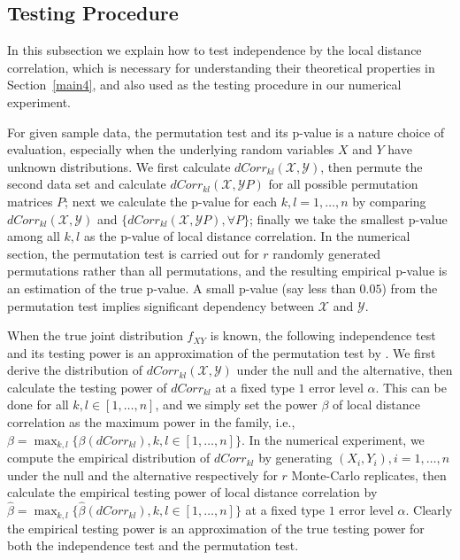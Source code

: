 \documentclass[12pt]{article}
\begin{document}
\subsection{Testing Procedure}
\label{main3}
In this subsection we explain how to test independence by the local distance correlation, which is necessary for understanding their theoretical properties in Section~\ref{main4}, and also used as the testing procedure in our numerical experiment.

For given sample data, the permutation test and its p-value is a nature choice of evaluation, especially when the underlying random variables $X$ and $Y$ have unknown distributions. We first calculate $dCorr_{kl}(\mathcal{X},\mathcal{Y})$, then permute the second data set and calculate $dCorr_{kl}(\mathcal{X},\mathcal{Y}P)$ for all possible permutation matrices $P$; next we calculate the p-value for each $k,l=1,\ldots,n$ by comparing $dCorr_{kl}(\mathcal{X},\mathcal{Y})$ and $\{dCorr_{kl}(\mathcal{X},\mathcal{Y}P), \forall P\}$; finally we take the smallest p-value among all $k,l$ as the p-value of local distance correlation. In the numerical section, the permutation test is carried out for $r$ randomly generated permutations rather than all permutations, and the resulting empirical p-value is an estimation of the true p-value. A small p-value (say less than $0.05$) from the permutation test implies significant dependency between $\mathcal{X}$ and $\mathcal{Y}$.

When the true joint distribution $f_{XY}$ is known, the following independence test and its testing power is an approximation of the permutation test by \cite{LehnmanRomanoStatBook}. We first derive the distribution of $dCorr_{kl}(\mathcal{X}, \mathcal{Y})$ under the null and the alternative, then calculate the testing power of $dCorr_{kl}$ at a fixed type $1$ error level $\alpha$. This can be done for all $k,l\in [1,\ldots,n]$, and we simply set the power $\beta$ of local distance correlation as the maximum power in the family, i.e., $\beta=\max_{k,l}\{\beta(dCorr_{kl}), k,l\in [1,\ldots,n]\}$. In the numerical experiment, we compute the empirical distribution of $dCorr_{kl}$ by generating $(X_{i},Y_{i}), i=1,\ldots,n$ under the null and the alternative respectively for $r$ Monte-Carlo replicates, then calculate the empirical testing power of local distance correlation by $\hat{\beta}=\max_{k,l}\{\hat{\beta}(dCorr_{kl}), k,l\in [1,\ldots,n]\}$ at a fixed type $1$ error level $\alpha$. Clearly the empirical testing power is an approximation of the true testing power for both the independence test and the permutation test. 
\end{document}
